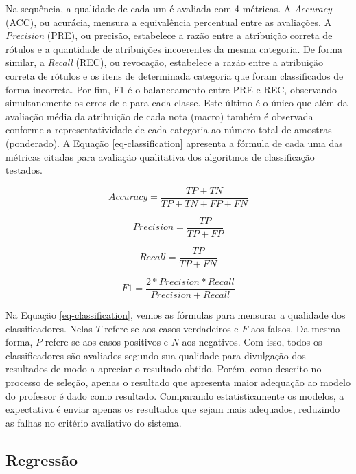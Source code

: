 Na sequência, a qualidade de cada um é avaliada com 4 métricas. A \textit{Accuracy} (ACC), ou acurácia, mensura a equivalência percentual entre as avaliações. A \textit{Precision} (PRE), ou precisão, estabelece a razão entre a atribuição correta de rótulos e a quantidade de atribuições incoerentes da mesma categoria. De forma similar, a \textit{Recall} (REC), ou revocação, estabelece a razão entre a atribuição correta de rótulos e os itens de determinada categoria que foram classificados de forma incorreta. Por fim, F1 é o balanceamento entre PRE e REC, observando simultanemente os erros de e para cada classe. Este último é o único que além da avaliação média da atribuição de cada nota (macro) também é observada conforme a representatividade de cada categoria ao número total de amostras (ponderado). A Equação \ref{eq-classification} apresenta a fórmula de cada uma das métricas citadas para avaliação qualitativa dos algoritmos de classificação testados.

\begin{equation}
Accuracy = \frac{TP+TN}{TP+TN+FP+FN}
\label{eq-classification}
\end{equation}

\begin{equation*}
Precision = \frac{TP}{TP+FP}
\end{equation*}

\begin{equation*}
Recall = \frac{TP}{TP+FN}
\end{equation*}

\begin{equation*}
F{1} = \frac{2*Precision*Recall}{Precision+Recall}
\end{equation*}

Na Equação \ref{eq-classification}, vemos as fórmulas para mensurar a qualidade dos classificadores. Nelas $ T $ refere-se aos casos verdadeiros e $ F $ aos falsos. Da mesma forma, $ P $ refere-se aos casos positivos e $ N $ aos negativos. Com isso, todos os classificadores são avaliados segundo sua qualidade para divulgação dos resultados de modo a apreciar o resultado obtido. Porém, como descrito no processo de seleção, apenas o resultado que apresenta maior adequação ao modelo do professor é dado como resultado. Comparando estatisticamente os modelos, a expectativa é enviar apenas os resultados que sejam mais adequados, reduzindo as falhas no critério avaliativo do sistema.

\subsection{Regressão}
\label{subsec-regressao}

